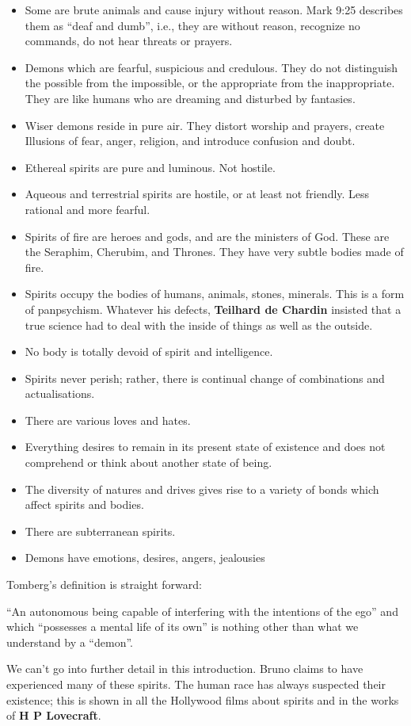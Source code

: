 \begin{itemize}
\item Some are brute animals and cause injury without reason. Mark 9:25 describes them as “deaf and dumb”, i.e., they
are without reason, recognize no commands, do not hear threats or prayers. 
\item Demons which are fearful, suspicious and credulous. They do not distinguish the possible from the impossible, or
the appropriate from the inappropriate. They are like humans who are dreaming and disturbed by fantasies. 
\item Wiser demons reside in pure air. They distort worship and prayers, create Illusions of fear, anger, religion, and
introduce confusion and doubt. 
\item Ethereal spirits are pure and luminous. Not hostile. 
\item Aqueous and terrestrial spirits are hostile, or at least not friendly. Less rational and more fearful. 
\item Spirits of fire are heroes and gods, and are the ministers of God. These are the Seraphim, Cherubim, and Thrones.
They have very subtle bodies made of fire. 
\item Spirits occupy the bodies of humans, animals, stones, minerals. This is a form of panpsychism. Whatever his
defects, \textbf{Teilhard de Chardin} insisted that a true science had to deal with the inside of things as well as the
outside. 
\item No body is totally devoid of spirit and intelligence. 
\item Spirits never perish; rather, there is continual change of combinations and actualisations. 
\item There are various loves and hates. 
\item Everything desires to remain in its present state of existence and does not comprehend or think about another
state of being. 
\item The diversity of natures and drives gives rise to a variety of bonds which affect spirits and bodies. 
\item There are subterranean spirits. 
\item Demons have emotions, desires, angers, jealousies 
\end{itemize}
Tomberg's definition is straight forward:

\begin{quotex}
“An autonomous being capable of interfering with the intentions of the ego” and which “possesses a mental life of its
own” is nothing other than what we understand by a “demon”.

\end{quotex}
We can't go into further detail in this introduction. Bruno claims to have experienced many of these
spirits. The human race has always suspected their existence; this is shown in all the Hollywood films about spirits
and in the works of \textbf{H P Lovecraft}.

